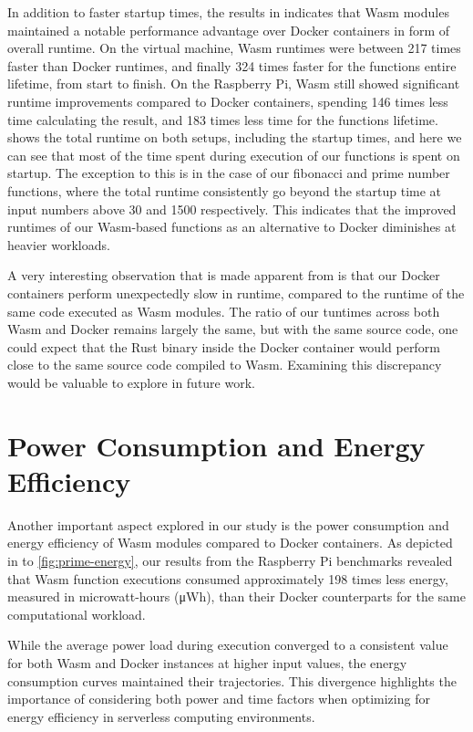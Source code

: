 \documentclass[
  table]{report}
\begin{document}
In addition to faster startup times, the results in
 indicates that \ac{Wasm} modules
maintained a notable performance advantage over Docker containers in
form of overall runtime. On the virtual machine, \ac{Wasm} runtimes were
between 217 times faster than Docker runtimes, and finally 324 times
faster for the functions entire lifetime, from start to finish. On the
Raspberry Pi, \ac{Wasm} still showed significant runtime improvements
compared to Docker containers, spending 146 times less time calculating
the result, and 183 times less time for the functions lifetime.
 shows the total runtime on
both setups, including the startup times, and here we can see that most
of the time spent during execution of our functions is spent on startup.
The exception to this is in the case of our fibonacci and prime number
functions, where the total runtime consistently go beyond the startup
time at input numbers above 30 and 1500 respectively. This indicates
that the improved runtimes of our \ac{Wasm}-based functions as an
alternative to Docker diminishes at heavier workloads.

A very interesting observation that is made apparent from
 is that our Docker containers perform
unexpectedly slow in runtime, compared to the runtime of the same code
executed as \ac{Wasm} modules. The ratio of our tuntimes across both
\ac{Wasm} and Docker remains largely the same, but with the same source
code, one could expect that the Rust binary inside the Docker container
would perform close to the same source code compiled to \ac{Wasm}.
Examining this discrepancy would be valuable to explore in future work.

\section{Power Consumption and Energy Efficiency}

Another important aspect explored in our study is the power consumption
and energy efficiency of \ac{Wasm} modules compared to Docker
containers. As depicted in  to
\cref{fig:prime-energy}, our results from the Raspberry Pi benchmarks
revealed that \ac{Wasm} function executions consumed approximately 198
times less energy, measured in microwatt-hours (μWh), than their Docker
counterparts for the same computational workload.

While the average power load during execution converged to a consistent
value for both \ac{Wasm} and Docker instances at higher input values,
the energy consumption curves maintained their trajectories. This
divergence highlights the importance of considering both power and time
factors when optimizing for energy efficiency in serverless computing
environments.
\end{document}

